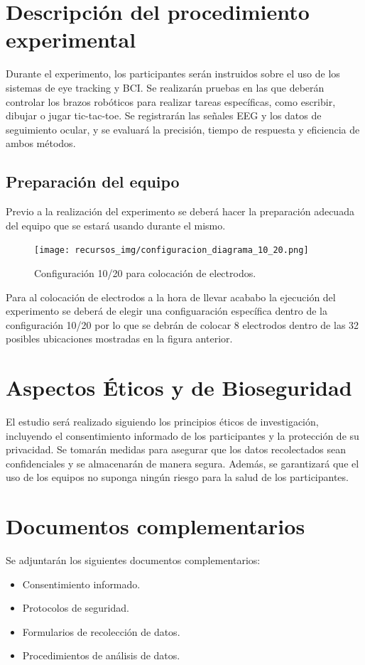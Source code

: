 \documentclass[12pt]{article}
\begin{document}
\section{Descripción del procedimiento experimental}
Durante el experimento, los participantes serán instruidos sobre el uso de los 
sistemas de eye tracking y BCI. Se realizarán pruebas en las que deberán controlar 
los brazos robóticos para realizar tareas específicas, como escribir, dibujar o 
jugar tic-tac-toe. Se registrarán las señales EEG y los datos de seguimiento 
ocular, y se evaluará la precisión, tiempo de respuesta y eficiencia de ambos 
métodos.

\subsection{Preparación del equipo}
Previo a la realización del experimento se deberá hacer la preparación 
adecuada del equipo que se estará usando durante el mismo.

\begin{figure}[h!]
    \centering
    \texttt{[image: recursos\_img/configuracion\_diagrama\_10\_20.png]}  %
    \caption{Configuración 10/20 para colocación de electrodos.}
    \label{fig:mi_imagen}  %
\end{figure}
Para al colocación de electrodos a la hora de llevar acababo la ejecución del 
experimento se deberá de elegir una configuaración específica dentro de  la 
configuración 10/20 por lo que se debrán de colocar 8 electrodos dentro de las 32 
posibles ubicaciones mostradas en la figura anterior.

\section{Aspectos Éticos y de Bioseguridad}
El estudio será realizado siguiendo los principios éticos de investigación, 
incluyendo el consentimiento informado de los participantes y la protección de su 
privacidad. Se tomarán medidas para asegurar que los datos recolectados sean 
confidenciales y se almacenarán de manera segura. Además, se garantizará que el 
uso de los equipos no suponga ningún riesgo para la salud de los participantes.

\section{Documentos complementarios}
Se adjuntarán los siguientes documentos complementarios:
\begin{itemize}
    \item Consentimiento informado.
    \item Protocolos de seguridad.
    \item Formularios de recolección de datos.
    \item Procedimientos de análisis de datos.
\end{itemize}
\end{document}
